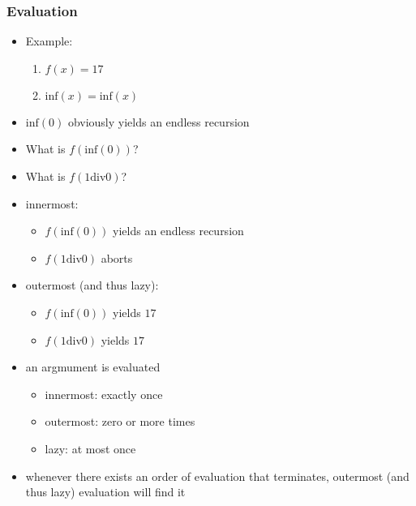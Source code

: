 \begin{multicols}{2}
\subsubsection{Evaluation}
\begin{itemize}
  \item Example:
  \begin{enumerate}
    \item $f(x) = 17$
    \item $\text{inf}(x) = \text{inf}(x)$
  \end{enumerate}
  \item $\text{inf}(0)$ obviously yields an endless recursion
  \item What is $f(\text{inf}(0))$?
  \item What is $f(1 \text{div} 0)$?
  \item innermost:
  \begin{itemize}
    \item $f(\text{inf}(0))$ yields an endless recursion
    \item $f(1 \text{div} 0)$ aborts
  \end{itemize}
  \item outermost (and thus lazy):
  \begin{itemize}
    \item $f(\text{inf}(0))$ yields $17$
    \item $f(1 \text{div} 0)$ yields $17$
  \end{itemize}
  \item an argmument is evaluated
  \begin{itemize}
    \item innermost: exactly once
    \item outermost: zero or more times
    \item lazy: at most once
  \end{itemize}
  \item whenever there exists an order of evaluation that terminates, outermost (and thus lazy) evaluation will find it
\end{itemize}




\end{multicols}
